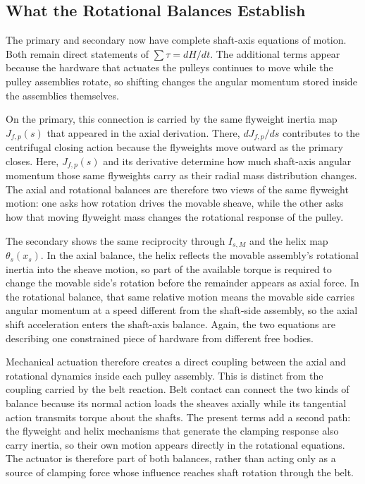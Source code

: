 \documentclass[11pt]{report}
\numberwithin{equation}{section}
\begin{document}

\subsection{What the Rotational Balances Establish}
\label{sec:rotational_balance_synthesis}

The primary and secondary now have complete shaft-axis equations of motion.
Both remain direct statements of \(\sum\tau=dH/dt\). The additional terms
appear because the hardware that actuates the pulleys continues to move while
the pulley assemblies rotate, so shifting changes the angular momentum stored
inside the assemblies themselves.

On the primary, this connection is carried by the same flyweight inertia map
\(J_{f,p}(s)\) that appeared in the axial derivation. There,
\(dJ_{f,p}/ds\) contributes to the centrifugal closing action because the
flyweights move outward as the primary closes. Here, \(J_{f,p}(s)\) and its
derivative determine how much shaft-axis angular momentum those same
flyweights carry as their radial mass distribution changes. The axial and
rotational balances are therefore two views of the same flyweight motion: one
asks how rotation drives the movable sheave, while the other asks how that
moving flyweight mass changes the rotational response of the pulley.

The secondary shows the same reciprocity through \(I_{s,M}\) and the helix map
\(\theta_s(x_s)\). In the axial balance, the helix reflects the movable
assembly's rotational inertia into the sheave motion, so part of the available
torque is required to change the movable side's rotation before the remainder
appears as axial force. In the rotational balance, that same relative motion
means the movable side carries angular momentum at a speed different from the
shaft-side assembly, so the axial shift acceleration enters the shaft-axis
balance. Again, the two equations are describing one constrained piece of
hardware from different free bodies.

Mechanical actuation therefore creates a direct coupling between the axial and
rotational dynamics inside each pulley assembly. This is distinct from the
coupling carried by the belt reaction. Belt contact can connect the two kinds
of balance because its normal action loads the sheaves axially while its
tangential action transmits torque about the shafts. The present terms add a
second path: the flyweight and helix mechanisms that generate the clamping
response also carry inertia, so their own motion appears directly in the
rotational equations. The actuator is therefore part of both balances, rather
than acting only as a source of clamping force whose influence reaches shaft
rotation through the belt.
\end{document}
